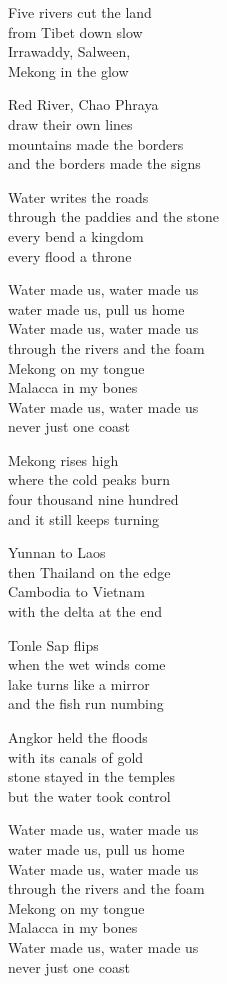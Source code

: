 \begin{lyrics}
Five rivers cut the land\\
from Tibet down slow\\
Irrawaddy, Salween,\\
Mekong in the glow

Red River, Chao Phraya\\
draw their own lines\\
mountains made the borders\\
and the borders made the signs

Water writes the roads\\
through the paddies and the stone\\
every bend a kingdom\\
every flood a throne

Water made us, water made us\\
water made us, pull us home\\
Water made us, water made us\\
through the rivers and the foam\\
Mekong on my tongue\\
Malacca in my bones\\
Water made us, water made us\\
never just one coast

Mekong rises high\\
where the cold peaks burn\\
four thousand nine hundred\\
and it still keeps turning

Yunnan to Laos\\
then Thailand on the edge\\
Cambodia to Vietnam\\
with the delta at the end

Tonle Sap flips\\
when the wet winds come\\
lake turns like a mirror\\
and the fish run numbing

Angkor held the floods\\
with its canals of gold\\
stone stayed in the temples\\
but the water took control

Water made us, water made us\\
water made us, pull us home\\
Water made us, water made us\\
through the rivers and the foam\\
Mekong on my tongue\\
Malacca in my bones\\
Water made us, water made us\\
never just one coast


\end{lyrics}
